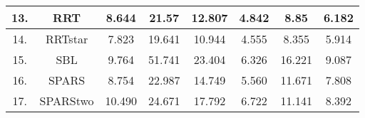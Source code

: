 \begin{table}[H]
\begin{tabular}{|c|c|c|c|c|c|c|c|}
\rowcolor[HTML]{EFEFEF} 
13. & RRT      & 8.644                                                                  & 21.57                                                                                          & 12.807                                                                      & 4.842                                                                                   & 8.85                                                                                     & 6.182                                                                                         \\ \hline
\rowcolor[HTML]{9AFF99} 
14. & RRTstar  & 7.823                                                                  & 19.641                                                                                         & 10.944                                                                      & 4.555                                                                                   & 8.355                                                                                    & 5.914                                                                                         \\ \hline
\rowcolor[HTML]{EFEFEF} 
15. & SBL      & 9.764                                                                  & 51.741                                                                                         & 23.404                                                                      & 6.326                                                                                   & 16.221                                                                                   & 9.087                                                                                         \\ \hline
\rowcolor[HTML]{C0C0C0} 
16. & SPARS    & 8.754                                                                  & 22.987                                                                                         & 14.749                                                                      & 5.560                                                                                   & 11.671                                                                                   & 7.808                                                                                         \\ \hline
\rowcolor[HTML]{EFEFEF} 
17. & SPARStwo & 10.490                                                                 & 24.671                                                                                         & 17.792                                                                      & 6.722                                                                                   & 11.141                                                                                   & 8.392                                                                                         \\ \hline

\end{tabular}
\end{table}
